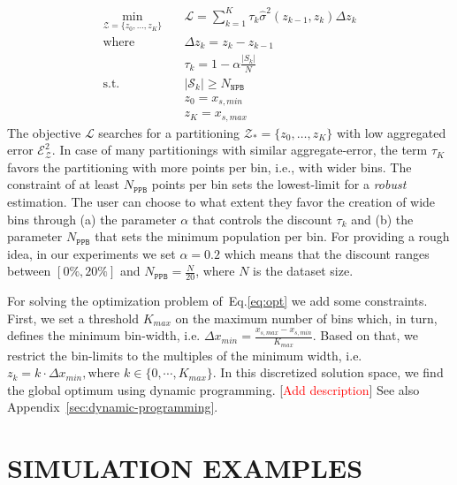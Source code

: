 \documentclass[twoside]{article}
\newcommand{\todo}[1]{[\textcolor{red}{#1}]}
\begin{document}
\begin{equation}
  \label{eq:opt}
\begin{aligned}
  \min_{ \mathcal{Z} = \{z_0, \ldots, z_K\}} \quad & \mathcal{L} = \sum_{k=1}^K \tau_k \hat{\sigma}^2(z_{k-1}, z_k) \Delta z_k \\
  \textrm{where} \quad & \Delta z_k = z_k - z_{k-1} \\
  & \tau_k = 1 - \alpha \frac{|S_k|}{N} \\
  \textrm{s.t.} \quad & |\mathcal{S}_k| \geq N_{\mathtt{NPB}}\\
                                     & z_0 = x_{s,min}\\
                                     & z_K = x_{s, max}
\end{aligned}
\end{equation}
%
The objective \(\mathcal{L}\) searches for a partitioning
\(\mathcal{Z}_* = \{ z_0, \ldots, z_K \} \) with low aggregated error
\(\mathcal{E}_{\mathcal{Z}}^2\). In case of many partitionings with
similar aggregate-error, the term \(\tau_K\) favors the partitioning
with more points per bin, i.e., with wider bins. The constraint of at
least \(N_{\mathtt{PPB}}\) points per bin sets the lowest-limit for a
\textit{robust} estimation. The user can choose to what extent they
favor the creation of wide bins through (a) the parameter \(\alpha\)
that controls the discount \(\tau_k\) and (b) the parameter
\(N_{\mathtt{PPB}}\) that sets the minimum population per bin. For
providing a rough idea, in our experiments we set \(\alpha = 0.2\)
which means that the discount ranges between \([0\%, 20\%]\) and
\(N_{\mathtt{PPB}} = \frac{N}{20}\), where \(N\) is the dataset size.

For solving the optimization problem of~Eq.\ref{eq:opt} we add some
constraints. First, we set a threshold \(K_{max}\) on the maximum
number of bins which, in turn, defines the minimum bin-width,
i.e. \(\Delta x_{min} = \frac{x_{s, max} - x_{s,min}}{K_{max}}\).
Based on that, we restrict the bin-limits to the multiples of the
minimum width, i.e.
\(z_k = k\cdot \Delta x_{min}, \text{where } k \in \{0 , \cdots,
K_{max}\} \). In this discretized solution space, we find the global
optimum using dynamic programming. \todo{Add description} See also
Appendix~\ref{sec:dynamic-programming}.



\section{SIMULATION EXAMPLES}
\label{sec:simulation-examples}
\end{document}
